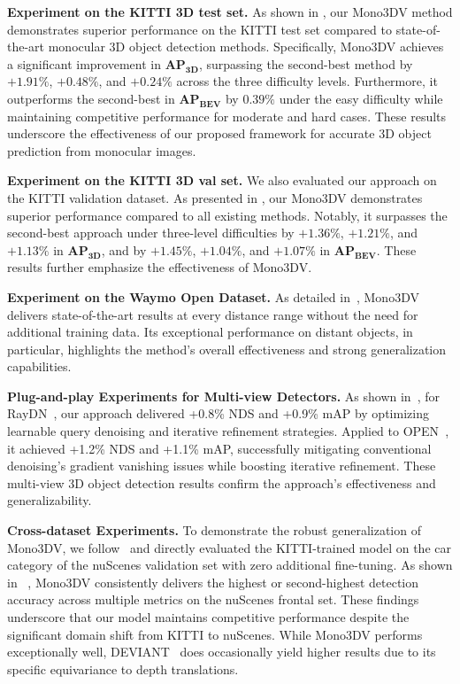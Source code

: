\noindent\textbf{Experiment on the KITTI 3D test set.}
As shown in , our Mono3DV method demonstrates superior performance on the KITTI test set compared to state-of-the-art monocular 3D object detection methods. Specifically, Mono3DV achieves a significant improvement in $\mathbf{AP_{3D}}$, surpassing the second-best method by $+1.91\%$, $+0.48\%$, and $+0.24\%$ across the three difficulty levels. Furthermore, it outperforms the second-best in $\mathbf{AP_{BEV}}$ by $0.39\%$ under the easy difficulty while maintaining competitive performance for moderate and hard cases. These results underscore the effectiveness of our proposed framework for accurate 3D object prediction from monocular images.

\noindent\textbf{Experiment on the KITTI 3D val set.} We also evaluated our approach on the KITTI validation dataset. As presented in , our Mono3DV demonstrates superior performance compared to all existing methods. Notably, it surpasses the second-best approach under three-level difficulties by $+1.36\%$, $+1.21\%$, and $+1.13\%$ in $\mathbf{AP_{3D}}$, and by $+1.45\%$, $+1.04\%$, and $+1.07\%$ in $\mathbf{AP_{BEV}}$. These results further emphasize the effectiveness of Mono3DV.

\noindent\textbf{Experiment on the Waymo Open Dataset.} As detailed in~, Mono3DV delivers state-of-the-art results at every distance range without the need for additional training data. Its exceptional performance on distant objects, in particular, highlights the method's overall effectiveness and strong generalization capabilities.


\noindent\textbf{Plug-and-play Experiments for Multi-view Detectors.} As shown in~, for RayDN~\cite{RayDN}, our approach delivered +0.8\% NDS and +0.9\% mAP by optimizing learnable query denoising and iterative refinement strategies. Applied to OPEN~\cite{OPEN}, it achieved +1.2\% NDS and +1.1\% mAP, successfully mitigating conventional denoising's gradient vanishing issues while boosting iterative refinement. These multi-view 3D object detection results confirm the approach's effectiveness and generalizability.


\noindent\textbf{Cross-dataset Experiments.} To demonstrate the robust generalization of Mono3DV, we follow~\cite{DEVIANT,MonoUNI} and directly evaluated the KITTI-trained model on the car category of the nuScenes validation set with zero additional fine-tuning. As shown in ~, Mono3DV consistently delivers the highest or second-highest detection accuracy across multiple metrics on the nuScenes frontal set. These findings underscore that our model maintains competitive performance despite the significant domain shift from KITTI to nuScenes. While Mono3DV performs exceptionally well, DEVIANT~\cite{DEVIANT} does occasionally yield higher results due to its specific equivariance to depth translations.


